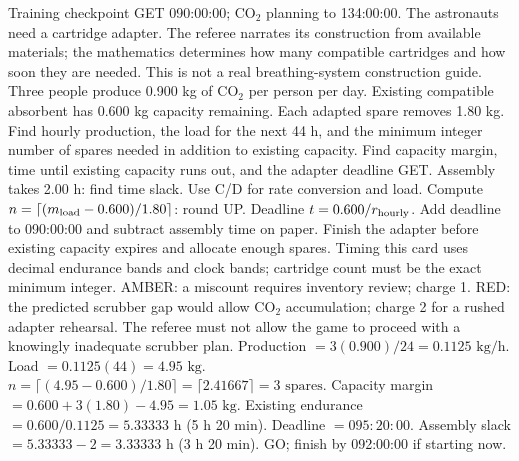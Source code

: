 {Training checkpoint GET 090:00:00; CO\(_2\) planning to 134:00:00.}
{The astronauts need a cartridge adapter. The referee narrates its
construction from available materials; the mathematics determines
how many compatible cartridges and how soon they are needed.
This is not a real breathing-system construction guide.}
{Three people produce 0.900 kg of CO\(_2\) per person per day.
Existing compatible absorbent has 0.600 kg capacity remaining.
Each adapted spare removes 1.80 kg.
Find hourly production, the load for the next 44 h, and the minimum
integer number of spares needed in addition to existing capacity.
Find capacity margin, time until existing capacity runs out,
and the adapter deadline GET. Assembly takes 2.00 h: find time slack.}
{Use C/D for rate conversion and load.
Compute \(n=\lceil(m_{\rm load}-0.600)/1.80\rceil\): round UP.
Deadline \(t=0.600/r_{\rm hourly}\).
Add deadline to 090:00:00 and subtract assembly time on paper.}
{Finish the adapter before existing capacity expires and allocate enough
spares. Timing this card uses decimal endurance bands and clock bands;
cartridge count must be the exact minimum integer.}
{AMBER: a miscount requires inventory review; charge 1.
RED: the predicted scrubber gap would allow CO\(_2\) accumulation;
charge 2 for a rushed adapter rehearsal. The referee must not allow
the game to proceed with a knowingly inadequate scrubber plan.}
{Production \(=3(0.900)/24=\boxed{0.1125\text{ kg/h}}\).
Load \(=0.1125(44)=\boxed{4.95\text{ kg}}\).
\(n=\lceil(4.95-0.600)/1.80\rceil
=\lceil2.41667\rceil=\boxed{3\text{ spares}}\).
Capacity margin \(=0.600+3(1.80)-4.95
=\boxed{1.05\text{ kg}}\).
Existing endurance \(=0.600/0.1125
=\boxed{5.33333\text{ h}}\) (5 h 20 min).
Deadline \(=\boxed{095{:}20{:}00}\).
Assembly slack \(=5.33333-2=\boxed{3.33333\text{ h}}\)
(3 h 20 min). GO; finish by 092:00:00 if starting now.}

